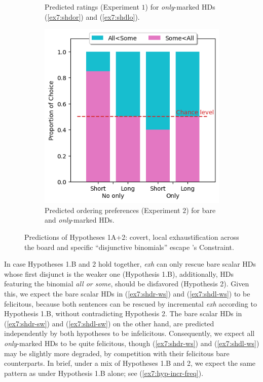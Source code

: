 \begin{figure}[H]
\begin{subfigure}[t]{.3\linewidth}
		\caption[]{Predicted ratings (Experiment $1$) for \textit{only}-marked HDs (\ref{ex7:shdor}) and (\ref{ex7:shdlo}).}
	\end{subfigure}
	\hfill
	\begin{subfigure}[t]{.3\linewidth}
		\centering
		\includegraphics[width=\linewidth]{./images/pred-2-pref.png}
		\caption[]{Predicted ordering preferences (Experiment $2$) for bare and \textit{only}-marked HDs.}
	\end{subfigure}
	\caption[]{Predictions of Hypotheses 1A+2: covert, local exhaustification across the board and specific ``disjunctive binomials'' escape \citeauthor{Hurford1974}'s Constraint.}\label{fig7:predictions-exh-atb-freq}
\end{figure} 

In case Hypotheses 1.B and 2 hold together, \textit{exh} can only rescue bare scalar HDs whose first disjunct is the weaker one (Hypothesis 1.B), additionally, HDs featuring the binomial \textit{all or some}, should be disfavored (Hypothesis 2). Given this, we expect the bare scalar HDs in (\ref{ex7:shdr-ws}) and (\ref{ex7:shdl-ws}) to be felicitous, because both sentences can be rescued by incremental \textit{exh} according to Hypothesis 1.B, without contradicting Hypothesis 2. The bare scalar HDs in (\ref{ex7:shdr-sw}) and (\ref{ex7:shdl-sw}) on the other hand, are predicted independently by both hypotheses to be infelicitous. Consequently, we expect all \textit{only}-marked HDs to be quite felicitous, though (\ref{ex7:shdr-ws}) and (\ref{ex7:shdl-ws}) may be slightly more degraded, by competition with their felicitous bare counterparts. In brief, under a mix of Hypotheses 1.B and 2, we expect the same pattern as under Hypothesis 1.B alone; see (\ref{ex7:hyp-incr-freq}).

